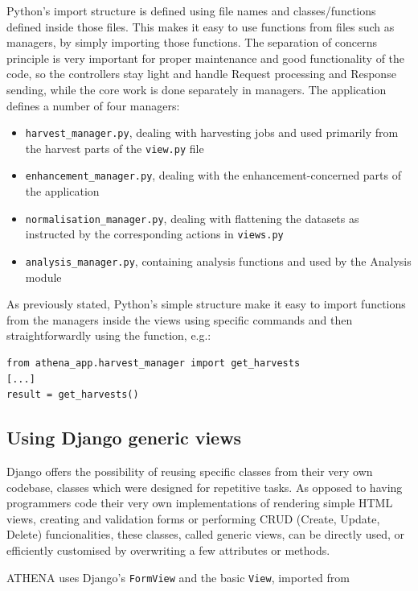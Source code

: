 Python's import structure is defined using file names and classes/functions defined inside those files. This makes it easy to use functions from files such as managers, by simply importing those functions. The separation of concerns principle is very important for proper maintenance and good functionality of the code, so the controllers stay light and handle Request processing and Response sending, while the core work is done separately in managers. The application defines a number of four managers:

\begin{itemize}
\item \texttt{harvest\_manager.py}, dealing with harvesting jobs and used primarily from the harvest parts of the \texttt{view.py} file
\item \texttt{enhancement\_manager.py}, dealing with the enhancement-concerned parts of the application
\item \texttt{normalisation\_manager.py}, dealing with flattening the datasets as instructed by the corresponding actions in \texttt{views.py}
\item \texttt{analysis\_manager.py}, containing analysis functions and used by the Analysis module
\end{itemize}

As previously stated, Python's simple structure make it easy to import functions from the managers inside the views using specific commands and then straightforwardly using the function, e.g.:

\begin{lstlisting}
from athena_app.harvest_manager import get_harvests
[...]
result = get_harvests()
\end{lstlisting}

\subsection{Using Django generic views}
Django offers the possibility of reusing specific classes from their very own codebase, classes which were designed for repetitive tasks. As opposed to having programmers code their very own implementations of rendering simple HTML views, creating and validation forms or performing CRUD (Create, Update, Delete) funcionalities, these classes, called generic views, can be directly used, or efficiently customised by overwriting a few attributes or methods.

ATHENA uses Django's \texttt{FormView} and the basic \texttt{View}, imported from

